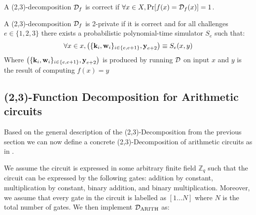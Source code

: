 \begin{definition}[Correctness]
\label{def:decomp_correctness}
A (2,3)-decomposition $\mathcal{D}_{f}$ is correct if
$\forall x \in X, \operatorname{Pr}[f(x) = \mathcal{D}_{f}(x)] = 1$.
\end{definition}

\begin{definition}[Privacy]
\label{def:decomp_privacy}
A (2,3)-decomposition $\mathcal{D}_{f}$ is 2-private if it is correct and for all challenges
$e \in \{1,2,3\}$ there exists a probabilistic polynomial-time simulator $S_{e}$
such that:
\[
  \forall x \in x, \left(\{\textbf{k}_{i}, \textbf{w}_{i} \}_{i \in \{e, e+1\}}, \textbf{y}_{e+2} \right)
  \equiv S_{e}(x, y)
\]
Where $\left(\{\textbf{k}_{i}, \textbf{w}_{i} \}_{i \in \{e, e+1\}}, \textbf{y}_{e+2}
\right)$ is produced by running $\mathcal{D}$ on input $x$ and $y$ is the result of computing $f(x) = y$
\end{definition}

\subsection{(2,3)-Function Decomposition for Arithmetic circuits}
\label{subsec:general:arith}
Based on the general description of the (2,3)-Decomposition from the previous
section we can now define a concrete (2,3)-Decomposition of arithmetic circuits
as in \cite{zkboo}.

We assume the circuit is expressed in some arbitrary finite field
$\mathbb{Z}_{q}$ such that the circuit can be expressed by the following gates: addition by constant,
multiplication by constant, binary addition, and binary multiplication.
Moreover, we assume that every gate in the circuit is labelled as $[1 \dots N]$ where $N$ is
the total number of gates.
We then implement $\mathcal{D}_{\text{ARITH}}$ as:

